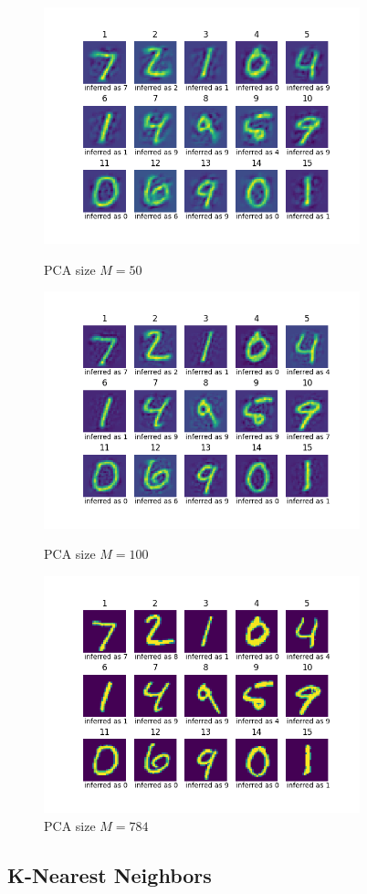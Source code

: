 \documentclass[conference]{IEEEtran}
\begin{document}
\begin{figure}[!t]
	\centering
	\includegraphics[width=3.6in]{reconst-PCA-50.png}
	\caption{PCA size $M=50$}
	\label{fig:pca_50}

	\includegraphics[width=3.6in]{reconst-PCA-100.png}	
	\caption{PCA size $M=100$}
	\label{fig:pca_100}

	\includegraphics[width=3.6in]{reconst-PCA-784.png}
	\caption{PCA size $M=784$}
	\label{fig:pca_784}
\end{figure}


\subsection{K-Nearest Neighbors}
\end{document}
